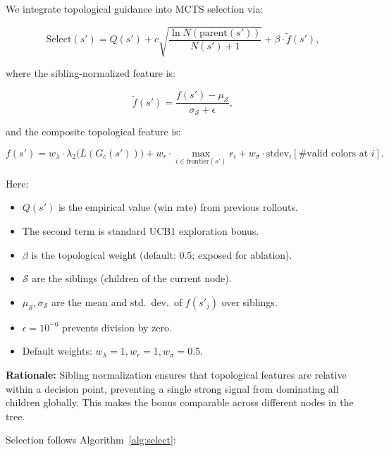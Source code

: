 \documentclass[11pt]{article}
\begin{document}
We integrate topological guidance into MCTS selection via:

\begin{equation}
\mathrm{Select}(s') = Q(s') + c \sqrt{\frac{\ln N(\mathrm{parent}(s'))}{N(s') + 1}} + \beta \cdot \widetilde{f}(s'),
\label{eq:selection}
\end{equation}

where the sibling-normalized feature is:

\begin{equation}
\widetilde{f}(s') = \frac{f(s') - \mu_{\mathcal{S}}}{\sigma_{\mathcal{S}} + \epsilon},
\label{eq:sibling-norm}
\end{equation}

and the composite topological feature is:

\begin{equation}
f(s') = w_\lambda \cdot \lambda_2\big(L(G_c(s'))\big) + w_r \cdot \max_{i \in \mathrm{frontier}(s')} r_i + w_\sigma \cdot \mathrm{stdev}_i[\text{\# valid colors at } i].
\label{eq:feature}
\end{equation}

Here:
\begin{itemize}
\item $Q(s')$ is the empirical value (win rate) from previous rollouts.
\item The second term is standard UCB1 exploration bonus.
\item $\beta$ is the topological weight (default: 0.5; exposed for ablation).
\item $\mathcal{S}$ are the siblings (children of the current node).
\item $\mu_{\mathcal{S}}, \sigma_{\mathcal{S}}$ are the mean and std.~dev.~of $f(s'_j)$ over siblings.
\item $\epsilon = 10^{-6}$ prevents division by zero.
\item Default weights: $w_\lambda = 1, w_r = 1, w_\sigma = 0.5$.
\end{itemize}

\textbf{Rationale:} Sibling normalization ensures that topological features are relative within a decision point, preventing a single strong signal from dominating all children globally. This makes the bonus comparable across different nodes in the tree.

Selection follows Algorithm~\ref{alg:select}:
\end{document}
